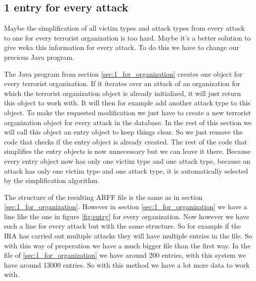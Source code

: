 \documentclass[a4]{article}
\begin{document}
\subsection{1 entry for every attack}
\label{sec:1_for_attack}
Maybe the simplification of all victim types and attack types from every attack to one for every terrorist organization is too hard. Maybe it's a better solution to give weka this information for every attack. To do this we have to change our precious Java program.\par
The Java program from section \ref{sec:1_for_organization} creates one object for every terrorist organization. If it iterates over an attack of an organization for which the terrorist organization object is already initialized, it will just return this object to work with. It will then for example add another attack type to this object. To make the requested modification we just have to create a new terrorist organization object for every attack in the database. In the rest of this section we will call this object an entry object to keep things clear. So we just remove the code that checks if the entry object is already created. The rest of the code that simplifies the entry objects is now unnecessary but we can leave it there. Because every entry object now has only one victim type and one attack type, because an attack has only one victim type and one attack type, it is automatically selected by the simplification algorithm.\par
The structure of the resulting ARFF file is the same as in section \ref{sec:1_for_organization}. However in section  \ref{sec:1_for_organization} we have a line like the one in figure \ref{fig:entry} for every organization. Now however we have such a line for every attack but with the same structure. So for example if the IRA has carried out multiple attacks they will have multiple entries in the file. So with this way of preperation we have a much bigger file than the first way. In the file of \ref{sec:1_for_organization} we have around 200 entries, with this system we have around 13000 entries. So with this method we have a lot more data to work with.
\end{document}

